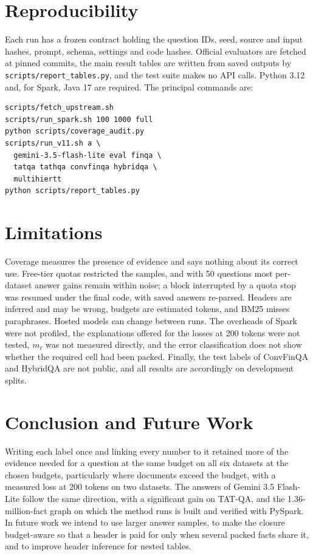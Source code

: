 \documentclass[11pt]{article}
\begin{document}
\section{Reproducibility}
\label{sec:repro}
Each run has a frozen contract holding the question IDs, seed, source and input hashes,
prompt, schema, settings and code hashes. Official evaluators are fetched at pinned
commits, the main result tables are written from saved outputs by
\texttt{scripts/report\_tables.py}, and the test suite makes no API calls. Python 3.12
and, for Spark, Java 17 are required. The principal commands are:

\begin{small}
\begin{verbatim}
scripts/fetch_upstream.sh
scripts/run_spark.sh 100 1000 full
python scripts/coverage_audit.py
scripts/run_v11.sh a \
  gemini-3.5-flash-lite eval finqa \
  tatqa tathqa convfinqa hybridqa \
  multihiertt
python scripts/report_tables.py
\end{verbatim}
\end{small}

\section{Limitations}
\label{sec:limits}
Coverage measures the presence of evidence and says
nothing about its correct use. Free-tier quotas restricted the samples, and with 50
questions most per-dataset answer gains remain within noise; a block interrupted by a
quota stop was resumed under the final code, with saved answers re-parsed. Headers are
inferred and may be wrong, budgets are estimated tokens, and BM25 misses paraphrases.
Hosted models can change between runs. The overheads of Spark were not profiled, the
explanations offered for the losses at 200 tokens were not tested, $m_\ell$ was not
measured directly, and the error classification does not show whether the required cell
had been packed. Finally, the test labels of ConvFinQA and HybridQA are not public, and
all results are accordingly on development splits.

\section{Conclusion and Future Work}
Writing each label once and linking every
number to it retained more of the evidence needed for a question at the same budget on
all six datasets at the chosen budgets, particularly where documents exceed the budget,
with a measured loss at 200 tokens on two datasets. The answers of Gemini 3.5 Flash-Lite
follow the same direction, with a significant gain on TAT-QA, and the 1.36-million-fact
graph on which the method runs is built and verified with PySpark. In future work we
intend to use larger answer samples, to make the closure budget-aware so that a header
is paid for only when several packed facts share it, and to improve header inference for
nested tables.



\end{document}
